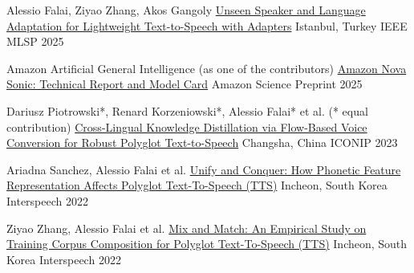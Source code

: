 
\begin{cvpubs}

  \cvpub
    {Alessio Falai, Ziyao Zhang, Akos Gangoly}
    {\href{https://ieeexplore.ieee.org/abstract/document/11204217}{Unseen Speaker and Language Adaptation for Lightweight Text-to-Speech with Adapters}}
    {Istanbul, Turkey}
    {IEEE MLSP 2025}

  \cvpub
    {Amazon Artificial General Intelligence (as one of the contributors)}
    {\href{https://www.amazon.science/publications/amazon-nova-sonic-technical-report-and-model-card}{Amazon Nova Sonic: Technical Report and Model Card}}
    {Amazon Science}
    {Preprint 2025}
  
  \cvpub
    {Dariusz Piotrowski*, Renard Korzeniowski*, Alessio Falai* et al. (* equal contribution)}
    {\href{https://link.springer.com/chapter/10.1007/978-981-99-8126-7_20}{Cross-Lingual Knowledge Distillation via Flow-Based Voice Conversion for Robust Polyglot Text-to-Speech}}
    {Changsha, China}
    {ICONIP 2023}

  \cvpub
    {Ariadna Sanchez, Alessio Falai et al.}
    {\href{https://www.isca-speech.org/archive/interspeech_2022/sanchez22_interspeech.html}{Unify and Conquer: How Phonetic Feature Representation Affects Polyglot Text-To-Speech (TTS)}}
    {Incheon, South Korea}
    {Interspeech 2022}

  \cvpub
    {Ziyao Zhang, Alessio Falai et al.}
    {\href{https://www.isca-speech.org/archive/interspeech_2022/zhang22c_interspeech.html}{Mix and Match: An Empirical Study on Training Corpus Composition for Polyglot Text-To-Speech (TTS)}}
    {Incheon, South Korea}
    {Interspeech 2022}

\end{cvpubs}
